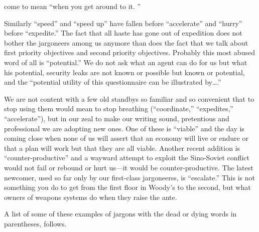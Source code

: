 \documentclass[
    oneside,
    11pt,
]{memoir}
\begin{document}
come to mean \enquote{when you get around to it. }

Similarly \enquote{speed} and \enquote{speed up} have fallen before \enquote{accelerate} and \enquote{hurry} before \enquote{expedite.} The fact that all haste has gone out of expedition does not bother the jargoneers among us anymore than does the fact that we talk about first  priority objectives and second priority objectives. Probably this most abused word of all is \enquote{potential.} We do not ask what an agent can do for us but what his potential, security leaks are not known or possible but known or potential, and the \enquote{potential utility of this questionnaire can be illustrated by\dots.}

We are not content with a few old standbys so familiar and so convenient that to stop using them would mean to stop breathing (\enquote{coordinate,} \enquote{expedites,} \enquote{accelerate}), but in our zeal to make our writing sound, pretentious and professional we are adopting new ones. One of these is \enquote{viable} and the day is coming close when none of us will assert that an economy will live or endure or that a plan will work but that they are all viable. Another recent addition is \enquote{counter-productive} and a wayward attempt to exploit the Sino-Soviet conflict would not fail or rebound or hurt us---it would be counter-productive. The latest newcomer, used so far only by our first-class jargoneerss, is \enquote{escalate.} This is not something you do to get from the first floor in Woody's to the second, but what owners of weapons systems do when they raise the ante.

A list of some of these examples of jargons with the dead or dying words in parentheses, follows.
\end{document}
